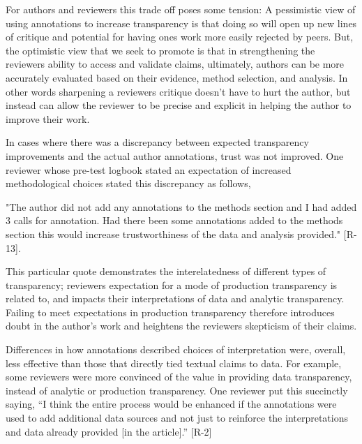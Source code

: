 \documentclass[sigchi]{acmart}
\begin{document}
For authors and reviewers this trade off poses some tension: A pessimistic view of using annotations to increase transparency is that doing so will open up new lines of critique and potential for having ones work more easily rejected by peers. But, the optimistic view that we seek to promote is that in strengthening the reviewers ability to access and validate claims, ultimately, authors can be more accurately evaluated based on their evidence, method selection, and analysis. In other words sharpening a reviewers critique doesn't have to hurt the author, but instead can allow the reviewer to be precise and explicit in helping the author to improve their work. 

In cases where there was a discrepancy between expected transparency improvements and the actual author annotations, trust was not improved. One reviewer whose pre-test logbook stated an expectation of increased methodological choices stated this discrepancy as follows,
\begin{displayquote}"The author did not add any annotations to the methods section and I had added 3 calls for annotation. Had there been some annotations added to the methods section this would increase trustworthiness of the data and analysis provided." [R-13]. 
\end{displayquote}
This particular quote demonstrates the interelatedness of different types of transparency; reviewers expectation for a mode of production transparency is related to, and impacts their interpretations of data and analytic transparency. Failing to meet expectations in production transparency therefore introduces doubt in the author's work and heightens the reviewers skepticism of their claims.   

Differences in how annotations described choices of interpretation were, overall, less effective than those that directly tied textual claims to data. For example, some reviewers were more convinced of the value in providing data transparency, instead of analytic or production transparency. One reviewer put this succinctly saying, “I think the entire process would be enhanced if the annotations were used to add additional data sources and not just to reinforce the interpretations and data already provided [in the article].” [R-2] 
\end{document}
